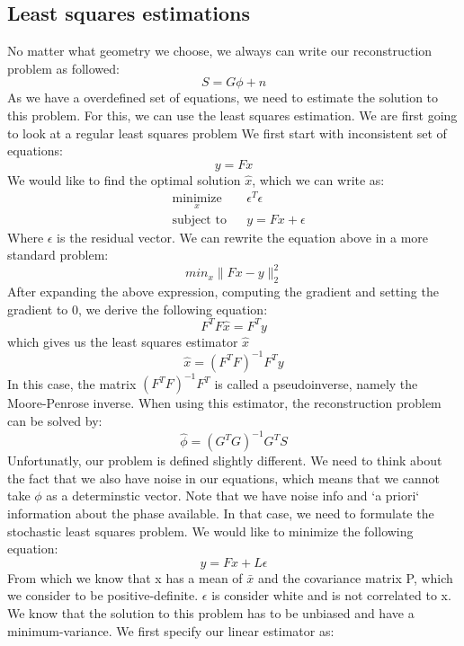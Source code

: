\documentclass{article}
\begin{document}
\subsection{Least squares estimations}
No matter what geometry we choose, we always can write our reconstruction problem as followed:
$$ S=G\phi +n$$
As we have a overdefined set of equations, we need to estimate the solution to this problem. For this, we can use the least squares estimation. We are first going to look at a regular least squares problem
\newline
\newline
We first start with inconsistent set of equations:
$$ y=Fx $$
We would like to find the optimal solution $\hat{x}$, which we can write as:
\newline
\newline
\begin{equation*}
\begin{aligned}
& \underset{x}{\text{minimize}}
& & \epsilon^T\epsilon \\
& \text{subject to}
& & y=Fx + \epsilon
\end{aligned}
\end{equation*}
\newline
\newline
Where $\epsilon$ is the residual vector. We can rewrite the equation above in a more standard problem:
$$ min_x\|Fx-y\|_2^2$$ 
After expanding the above expression, computing the gradient and setting the gradient to 0, we derive the following equation:
$$ F^TF\hat{x}=F^Ty $$
which gives us the least squares estimator $\hat{x}$
$$ \hat{x} = (F^TF)^{-1}F^Ty $$
In this case, the matrix $(F^TF)^{-1}F^T$ is called a pseudoinverse, namely the Moore-Penrose inverse.
When using this estimator, the reconstruction problem can be solved by:
$$ \hat{\phi} = (G^TG)^{-1}G^TS  $$
\newline
\newline
Unfortunatly, our problem is defined slightly different. We need to think about the fact that we also have noise in our equations, which means that we cannot take $\phi$ as a determinstic vector. Note that we have noise info and `a priori` information about the phase available. In that case, we need to formulate the stochastic least squares problem. We would like to minimize the following equation:
$$ y=Fx+L\epsilon$$
From which we know that x has a mean of $\bar{x}$ and the covariance matrix P, which we consider to be positive-definite.
$\epsilon$ is consider white and is not correlated to x. We know that the solution to this problem has to be unbiased and have a minimum-variance. We first specify our linear estimator as:
\end{document}
